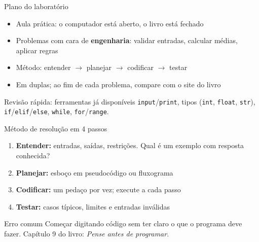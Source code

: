 \documentclass[aspectratio=169,10pt,t]{beamer}
\begin{document}
\capa

\begin{frame}{Plano do laboratório}
  \begin{itemize}
    \item Aula prática: o computador está aberto, o livro está fechado
    \item Problemas com cara de \textbf{engenharia}: validar entradas, calcular médias, aplicar regras
    \item Método: \alert{entender \(\to\) planejar \(\to\) codificar \(\to\) testar}
    \item Em duplas; ao fim de cada problema, compare com o site do livro
  \end{itemize}
  \begin{block}{Revisão rápida: ferramentas já disponíveis}
    \texttt{input}/\texttt{print}, tipos (\texttt{int}, \texttt{float}, \texttt{str}), \texttt{if}/\texttt{elif}/\texttt{else}, \texttt{while}, \texttt{for}/\texttt{range}.
  \end{block}
\end{frame}

\begin{frame}{Método de resolução em 4 passos}
  \begin{enumerate}
    \item \textbf{Entender:} entradas, saídas, restrições. Qual é um exemplo com resposta conhecida?
    \item \textbf{Planejar:} esboço em pseudocódigo ou fluxograma
    \item \textbf{Codificar:} um pedaço por vez; execute a cada passo
    \item \textbf{Testar:} casos típicos, limites e entradas inválidas
  \end{enumerate}
  \vspace{1ex}
  \begin{alertblock}{Erro comum}
    Começar digitando código sem ter claro o que o programa deve fazer. Capítulo 9 do livro: \emph{Pense antes de programar}.
  \end{alertblock}
\end{frame}
\end{document}
